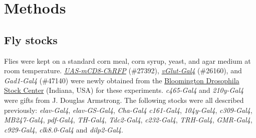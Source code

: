 \section*{Methods}

\subsection*{Fly stocks}

Flies were kept on a standard corn meal, corn syrup, yeast, and agar medium at room temperature.
\href{http://flystocks.bio.indiana.edu/Reports/27392.html}{\emph{UAS-mCD8-ChRFP}} (\#27392), \href{http://flystocks.bio.indiana.edu/Reports/26160.html}{\emph{vGlut-Gal4}} (\#26160), and \emph{Gad1-Gal4} (\#47140) were newly obtained from the \href{http://flystocks.bio.indiana.edu}{Bloomington Drosophila Stock Center} (Indiana, USA) for these experiments.
\emph{c465-Gal4} and \emph{210y-Gal4} were gifts from J. Douglas Armstrong\cite{Young:2010jq}.
The following stocks were all described previously: \emph{elav-Gal4}\cite{Lin:1994vn}, \emph{elav-GS-Gal4}\cite{Osterwalder_2001}, \emph{Cha-Gal4}\cite{Kitamoto:2001ue} \emph{c161-Gal4}\cite{renn:1999aa}, \emph{104y-Gal4}\cite{sakai:2006aa}, \emph{c309-Gal4}\cite{connolly:1996aa}, \emph{MB247-Gal4}\cite{zars:2000aa}, \emph{pdf-Gal4}\cite{renn:1999ab}, \emph{TH-Gal4}\cite{friggi-grelin:2003aa}, \emph{Tdc2-Gal4}\cite{alekseyenko:2010aa}, \emph{c232-Gal4}\cite{renn:1999aa}, \emph{TRH-Gal4}\cite{alekseyenko:2010aa}, \emph{GMR-Gal4}\cite{freeman:1996aa}, \emph{c929-Gal4}\cite{taghert:2001aa}, \emph{clk8.0-Gal4}\cite{glossop:2003aa} and \emph{dilp2-Gal4}\cite{Rulifson:2002cg}.
  
  
  